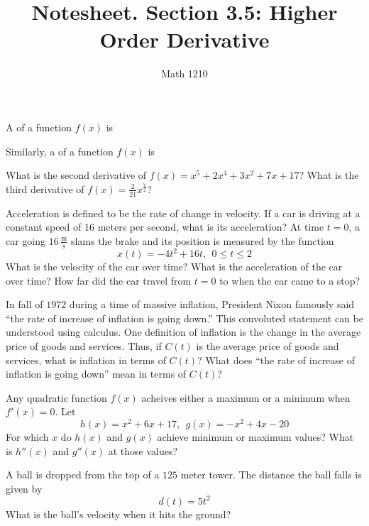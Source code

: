 \documentclass[12pt, a4paper]{article}
\author{Math 1210}
\title{Notesheet. Section 3.5: Higher Order Derivative}
\date{}
\begin{document}
\maketitle
\nameline
\begin{defi}
  A  of a function \(f(x)\) is
\end{defi}
\begin{defi}
  Similarly, a  of a function \(f(x)\) is
\end{defi}
\begin{ex}
  What is the second derivative of \(f(x) = x^5 + 2x^4 + 3x^2 + 7x +
  17\)? What is the third derivative of \(f(x) =
  \frac{2}{21}x^{\frac{7}{2}}\)?
\end{ex}
\begin{ex}
  Acceleration is defined to be the rate of change in velocity. If a
  car is driving at a constant speed of \(16\) meters per second, what is
  its acceleration? At time \(t=0\), a car going \(16\,\tfrac{\text{m}}{\text{s}}\) slams the
  brake and its
  position is measured by the function \[
    x(t) = -4 t^2 + 16 t,\ \ 0 \leq t \leq 2
  \]
  What is the velocity of the car over time? What is the acceleration
  of the car over time? How far did the car travel from \(t=0\) to
  when the car came to a stop?
\end{ex}
\begin{ex}
  In fall of \(1972\) during a time of massive inflation, President
  Nixon famously said ``the rate of
  increase of inflation is going down.''  This convoluted
  statement can be understood using calculus. One definition of
  inflation is the change
  in the average price of goods and services. Thus, if \(C(t)\) is the
  average price of goods and services, what is inflation in
  terms of \(C(t)\)? What does ``the rate of increase of inflation is
  going down'' mean in terms of \(C(t)\)?
\end{ex}
\begin{ex}
  Any quadratic function \(f(x)\) acheives
  either a maximum or a minimum when \(f'(x) = 0\). Let \[
    h(x) = x^2 + 6x + 17, \ \ g(x) = -x^2 + 4x - 20
  \]
  For which \(x\) do \(h(x)\) and \(g(x)\) achieve minimum or maximum
  values? What is \(h''(x)\) and \(g''(x)\) at those values?
\end{ex}
\begin{ex}
  A ball is dropped from the top of a \(125\) meter tower. The
  distance the ball falls is given by \[
    d(t) = 5 t^2
  \]
  What is the ball's velocity when it hits the ground?
\end{ex}
\end{document}

